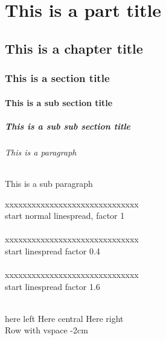 \documentclass[12pt, a4paper]{report}
\begin{document}
\part{This is a part title}
\chapter{This is a chapter title}
\section[This is Short section title]{This is a section title}
\subsection{This is a sub section title}
\subsubsection{This is a sub sub section title}
\paragraph{This is a paragraph}
\subparagraph{This is a sub paragraph}


\newpage

xxxxxxxxxxxxxxxxxxxxxxxxxxxxxx\\
\linespread{1}\selectfont
start normal linespread, factor 1\\
\lipsum[1]\\


xxxxxxxxxxxxxxxxxxxxxxxxxxxxxx\\
\linespread{0.4}\selectfont
start linespread factor 0.4\\
\lipsum[2]\\


xxxxxxxxxxxxxxxxxxxxxxxxxxxxxx\\
\linespread{1.6}\selectfont
start linespread factor 1.6\\
\lipsum[3]\\


\linespread{1}\selectfont
\newpage

\lipsum[1]

\vfill

here left \hfill Here central \hfill Here right\\

\vspace{-2cm} Row with vspace -2cm\\
\end{document}
